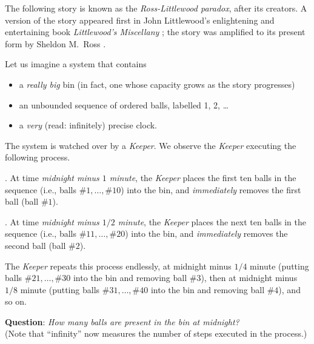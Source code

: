   
The following story is known as the {\it Ross-Littlewood paradox}, after its creators.  A version of the story appeared first in John Littlewood's enlightening and entertaining book {\it Littlewood's Miscellany} \cite{Littlewood-misc}; the story was amplified to its present form by Sheldon M.~Ross \cite{Ross76}. 

\medskip

Let us imagine a system that contains
\begin{itemize}
\item
a {\em really big} bin (in fact, one whose capacity grows as the story progresses)
\item
an unbounded sequence of ordered balls, labelled 1, 2, \ldots
\item
a {\em very} (read: infinitely) precise clock.
\end{itemize}
The system is watched over by a {\it Keeper}.  We observe the {\it Keeper} executing the following process.

\smallskip

.
At time {\em midnight minus $1$ minute}, the {\it Keeper} places the first ten balls in the sequence (i.e., balls $\#1, \ldots, \#10$) into the bin, and {\em immediately} removes the first ball (ball \#$1$).

\smallskip

.
At time {\em midnight minus $1/2$ minute}, the {\it Keeper} places the next ten balls in the sequence
(i.e., balls $\#11, \ldots, \#20$) into the bin, and {\em immediately} removes the second ball (ball \#$2$).

\smallskip

\noindent
The {\it Keeper} repeats this process endlessly, at midnight minus $1/4$ minute (putting balls $\#21, \ldots, \#30$ into the bin and removing ball \#$3$), then at midnight minus $1/8$ minute (putting
balls $\#31, \ldots, \#40$ into the bin and removing ball \#$4$), and so on.

\smallskip

\noindent
{\bf Question}: {\it How many balls are present in the bin at midnight?}  \\
(Note that ``infinity'' now measures the number of steps executed in the process.)

\medskip

